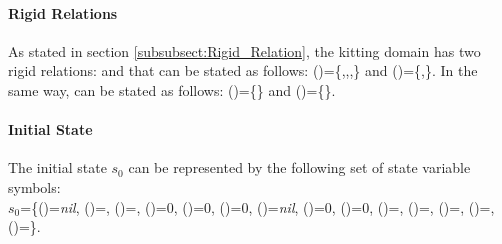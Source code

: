 \paragraph{Rigid Relations}
\begin{comment}
As stated in section \ref{subsubsect:Rigid_Relation}, the kitting domain has two rigid relations: \stvar{efftype} and \stvar{effhtype}. In the proposed example, the \class{EndEffector} \const{eff_1} can hold \class{KitTrays} and \class{KitInstances}, while the \class{EndEffector} \const{eff_1} can hold \class{Parts}. \stvar{efftype} can be stated as follows: \stvar{efftype}(\const{eff_1})=\{\const{kt_1},\const{kins_1}\} and \stvar{efftype}(\const{eff_1})=\{\const{part_{A-1}},\const{part_{A-2}},\const{part_{B}},\const{part_{C}}\}. In the same way, the \class{EndEffectorHolder} \const{effh_1} can hold the \class{EndEffector} \const{eff_1}, while the \class{EndEffectorHolder} \const{effh_2} can hold the \class{EndEffector} \const{eff_2}. \stvar{effhtype} can be stated as follows: \stvar{effhtype}(\const{effh_1})=\{\const{eff_1}\} and \stvar{effhtype}(\const{effh_2})=\{\const{eff_2}\}.
\end{comment}
As stated in section \ref{subsubsect:Rigid_Relation}, the kitting domain has two rigid relations:  and  that can be stated as follows: ()=\{,,,\} and ()=\{,\}. In the same way,  can be stated as follows: ()=\{\} and ()=\{\}.

\paragraph{Initial State}
The initial state $s_0$ can be represented by the following set of state variable symbols:\\
$s_0$=\{()=\textit{nil}, ()=, ()=, ()=0, ()=0, ()=0, ()=\textit{nil}, ()=0, ()=0, ()=, ()=, ()=, ()=, ()=\}.

